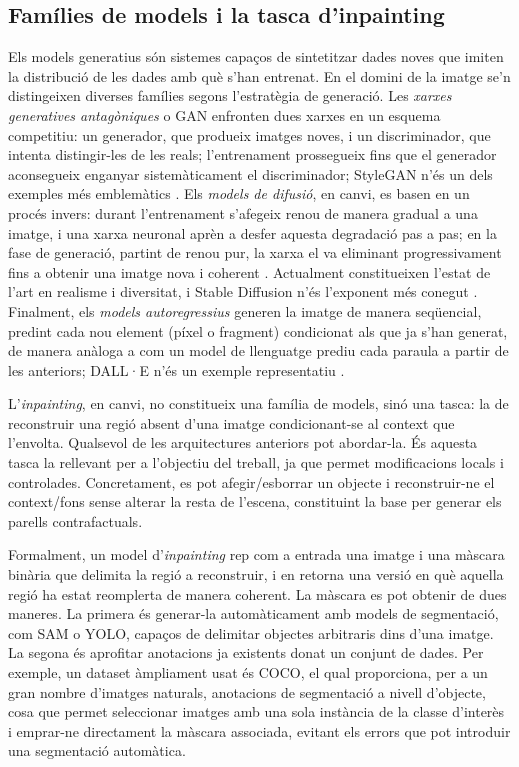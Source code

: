 \subsection{Famílies de models i la tasca d'inpainting}
Els models generatius són sistemes capaços de sintetitzar dades noves que imiten la distribució de les dades amb què s'han entrenat. En el domini de la imatge se'n distingeixen diverses famílies segons l'estratègia de generació. Les \emph{xarxes generatives antagòniques} o \ac{GAN} enfronten dues xarxes en un esquema competitiu: un generador, que produeix imatges noves, i un discriminador, que intenta distingir-les de les reals; l'entrenament prossegueix fins que el generador aconsegueix enganyar sistemàticament el discriminador; StyleGAN n'és un dels exemples més emblemàtics \cite{Karras2019}. Els \emph{models de difusió}, en canvi, es basen en un procés invers: durant l'entrenament s'afegeix renou de manera gradual a una imatge, i una xarxa neuronal aprèn a desfer aquesta degradació pas a pas; en la fase de generació, partint de renou pur, la xarxa el va eliminant progressivament fins a obtenir una imatge nova i coherent \cite{Ho2020}. Actualment constitueixen l'estat de l'art en realisme i diversitat, i Stable Diffusion n'és l'exponent més conegut \cite{Rombach2022}. Finalment, els \emph{models autoregressius} generen la imatge de manera seqüencial, predint cada nou element (píxel o fragment) condicionat als que ja s'han generat, de manera anàloga a com un model de llenguatge prediu cada paraula a partir de les anteriors; DALL·E n'és un exemple representatiu \cite{Ramesh2021}.

L'\emph{inpainting}, en canvi, no constitueix una família de models, sinó una tasca: la de reconstruir una regió absent d'una imatge condicionant-se al context que l'envolta. Qualsevol de les arquitectures anteriors pot abordar-la. És aquesta tasca la rellevant per a l'objectiu del treball, ja que permet modificacions locals i controlades. Concretament, es pot afegir/esborrar un objecte i reconstruir-ne el context/fons sense alterar la resta de l'escena, constituint la base per generar els parells contrafactuals.

Formalment, un model d'\emph{inpainting} rep com a entrada una imatge i una màscara binària que delimita la regió a reconstruir, i en retorna una versió en què aquella regió ha estat reomplerta de manera coherent. La màscara es pot obtenir de dues maneres. La primera és generar-la automàticament amb models de segmentació, com \ac{SAM}\cite{Kirillov2023} o \ac{YOLO}\cite{Redmon2016}, capaços de delimitar objectes arbitraris dins d'una imatge. La segona és aprofitar anotacions ja existents donat un conjunt de dades. Per exemple, un dataset àmpliament usat és \ac{COCO}\cite{Lin2015}, el qual proporciona, per a un gran nombre d'imatges naturals, anotacions de segmentació a nivell d'objecte, cosa que permet seleccionar imatges amb una sola instància de la classe d'interès i emprar-ne directament la màscara associada, evitant els errors que pot introduir una segmentació automàtica.

